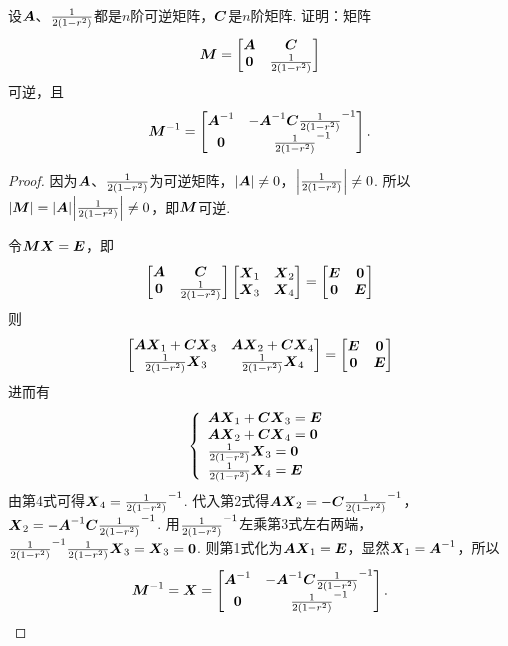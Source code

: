 \begin{example}
设\(\A\)、\(\B\)都是\(n\)阶可逆矩阵，\(\C\)是\(n\)阶矩阵.
证明：矩阵\[
	\mat{M} = \begin{bmatrix}
		\A & \C \\
		\z & \B
	\end{bmatrix}
\]可逆，且\[
	\mat{M}^{-1} = \begin{bmatrix}
		\A^{-1} & -\A^{-1} \C \B^{-1} \\
		\z & \B^{-1}
	\end{bmatrix}.
\]
\begin{proof}
因为\(\A\)、\(\B\)为可逆矩阵，\(\abs{\A} \neq 0\)，\(\abs{\B} \neq 0\).
所以\(\abs{\mat{M}}=\abs{\A}\abs{\B} \neq 0\)，即\(\mat{M}\)可逆.

令\(\mat{M}\x=\E\)，即\[
	\begin{bmatrix}
		\A & \C \\
		\z & \B
	\end{bmatrix}
	\begin{bmatrix}
		\x_1 & \x_2 \\
		\x_3 & \x_4
	\end{bmatrix}
	= \begin{bmatrix}
		\E & \z \\
		\z & \E
	\end{bmatrix}
\]则\[
	\begin{bmatrix}
		\A\x_1+\C\x_3 & \A\x_2+\C\x_4 \\
		\B\x_3 & \B\x_4
	\end{bmatrix}
	= \begin{bmatrix}
		\E & \z \\
		\z & \E
	\end{bmatrix}
\]
进而有\[
	\left\{ \begin{array}{l}
		\A\x_1+\C\x_3 = \E \\
		\A\x_2+\C\x_4 = \z \\
		\B\x_3 = \z \\
		\B\x_4 = \E
	\end{array} \right.
\]
由第4式可得\(\x_4 = \B^{-1}\).
代入第2式得\(\A\x_2=-\C\B^{-1}\)，
\(\x_2=-\A^{-1}\C\B^{-1}\).
用\(\B^{-1}\)左乘第3式左右两端，\(\B^{-1}\B\x_3=\x_3=\z\).
则第1式化为\(\A\x_1=\E\)，显然\(\x_1=\A^{-1}\)，所以\[
	\mat{M}^{-1} = \x = \begin{bmatrix}
		\A^{-1} & -\A^{-1}\C\B^{-1} \\
		\z & \B^{-1}
	\end{bmatrix}.
	\qedhere
\]
\end{proof}
\end{example}

